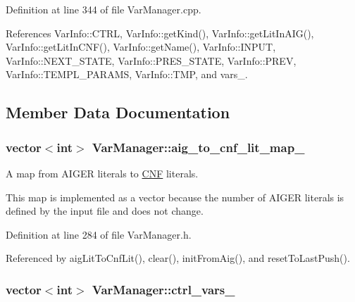 Definition at line 344 of file Var\-Manager.\-cpp.



References Var\-Info\-::\-C\-T\-R\-L, Var\-Info\-::get\-Kind(), Var\-Info\-::get\-Lit\-In\-A\-I\-G(), Var\-Info\-::get\-Lit\-In\-C\-N\-F(), Var\-Info\-::get\-Name(), Var\-Info\-::\-I\-N\-P\-U\-T, Var\-Info\-::\-N\-E\-X\-T\-\_\-\-S\-T\-A\-T\-E, Var\-Info\-::\-P\-R\-E\-S\-\_\-\-S\-T\-A\-T\-E, Var\-Info\-::\-P\-R\-E\-V, Var\-Info\-::\-T\-E\-M\-P\-L\-\_\-\-P\-A\-R\-A\-M\-S, Var\-Info\-::\-T\-M\-P, and vars\-\_\-.



\subsection{Member Data Documentation}
\hypertarget{classVarManager_abaa6d10a62f138bdc932a8e76c709849}{
\subsubsection[{aig\-\_\-to\-\_\-cnf\-\_\-lit\-\_\-map\-\_\-}]{\setlength{\rightskip}{0pt plus 5cm}vector$<$int$>$ Var\-Manager\-::aig\-\_\-to\-\_\-cnf\-\_\-lit\-\_\-map\-\_\-\hspace{0.3cm}{\ttfamily [protected]}}}\label{classVarManager_abaa6d10a62f138bdc932a8e76c709849}


A map from A\-I\-G\-E\-R literals to \hyperlink{classCNF}{C\-N\-F} literals. 

This map is implemented as a vector because the number of A\-I\-G\-E\-R literals is defined by the input file and does not change. 

Definition at line 284 of file Var\-Manager.\-h.



Referenced by aig\-Lit\-To\-Cnf\-Lit(), clear(), init\-From\-Aig(), and reset\-To\-Last\-Push().

\hypertarget{classVarManager_acb66edc1a4fc8ccc25321a59fe1668ff}{
\subsubsection[{ctrl\-\_\-vars\-\_\-}]{\setlength{\rightskip}{0pt plus 5cm}vector$<$int$>$ Var\-Manager\-::ctrl\-\_\-vars\-\_\-\hspace{0.3cm}{\ttfamily [protected]}}}\label{classVarManager_acb66edc1a4fc8ccc25321a59fe1668ff}


